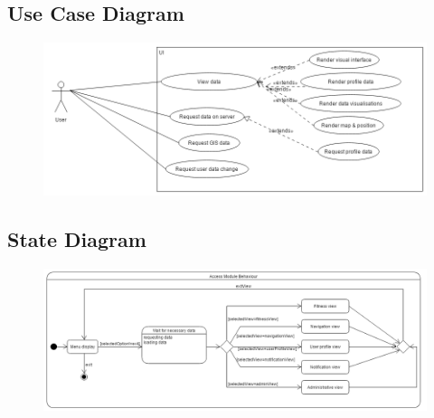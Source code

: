 \subsection{Use Case Diagram}
\begin{figure}[!htbp]
	\includegraphics[width=\textwidth]{Access_Modules/AUCD_v2.png}
\end{figure}

\subsection{State Diagram}
\begin{figure}[!htbp]
	\includegraphics[width=\textwidth]{Access_Modules/AccessStateDiagram.png}
\end{figure}



